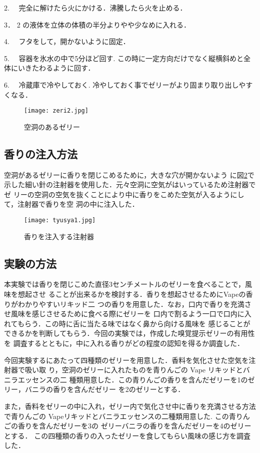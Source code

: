 2. 　完全に解けたら火にかける．沸騰したら火を止める．


3． 2 の液体を立体の体積の半分よりやや少なめに入れる．


4. 　フタをして，開かないように固定．


5. 　容器を氷水の中で5分ほど回す. この時に一定方向だけでなく縦横斜めと全体にいきたわるように回す．


6. 　冷蔵庫で冷やしておく. 冷やしておく事でゼリーがより固まり取り出しやすくなる．



  \begin{figure}[t]
    \centering
    \texttt{[image: zeri2.jpg]}
    \caption{空洞のあるゼリー}
    \label{zeri}
  \end{figure}


\subsection{香りの注入方法}
  空洞があるゼリーに香りを閉じこめるために，大きな穴が開かないよう
に図\ref{tyusya}で示した細い針の注射器を使用した．元々空洞に空気がはいっているため注射器でゼ
リーの空洞の空気を抜くことにより中に香りをこめた空気が入るようにして，注射器で香りを空
洞の中に注入した．

\begin{figure}[t]
  \centering
  \texttt{[image: tyusya1.jpg]}
  \caption{香りを注入する注射器}
  \label{tyusya}
\end{figure}


\subsection{実験の方法}

本実験では香りを閉じこめた直径3センチメートルのゼリーを食べることで，風味を想起させ
ることが出来るかを検討する．香りを想起させるためにVapeの香りがわかりやすいリキッド二
つの香りを用意した．なお，口内で香りを充満させ風味を感じさせるために食べる際にゼリーを
口内で割るよう一口で口内に入れてもらう．この時に舌に当たる味ではなく鼻から向ける風味を
感じることができるかを判断してもらう．今回の実験では，作成した嗅覚提示ゼリーの有用性を
調査するとともに，中に入れる香りがどの程度の認知を得るか調査した．


今回実験するにあたって四種類のゼリーを用意した．香料を気化させた空気を注射器で吸い取
り，空洞のゼリーに入れたものを青りんごの Vape リキッドとバニラエッセンスの二
種類用意した．この青りんごの香りを含んだゼリーを1のゼリー，バニラの香りを含んだゼリー
を2のゼリーとする．


また，香料をゼリーの中に入れ，ゼリー内で気化させ中に香りを充満させる方法で青りんごの
Vapeリキッドとバニラエッセンスの二種類用意した. この青りんごの香りを含んだゼリーを3の
ゼリーバニラの香りを含んだゼリーを4のゼリーとする．
この四種類の香りの入ったゼリーを食してもらい風味の感じ方を調査した．